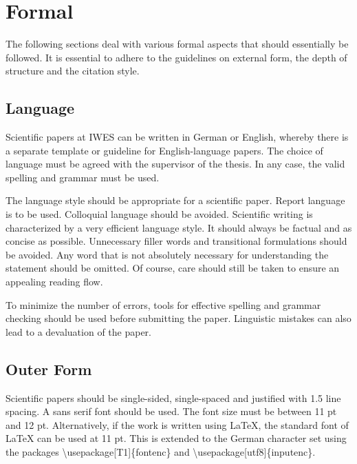 \chapter{Formal}
\label{cha:form_EN}

The following sections deal with various formal aspects that should essentially be followed. It is essential to adhere to the guidelines on external form, the depth of structure and the citation style.

\section{Language}
\label{sec:language}

Scientific papers at IWES can be written in German or English, whereby there is a separate template or guideline for English-language papers. The choice of language must be agreed with the supervisor of the thesis. In any case, the valid spelling and grammar must be used.

The language style should be appropriate for a scientific paper. Report language is to be used. Colloquial language should be avoided. Scientific writing is characterized by a very efficient language style. It should always be factual and as concise as possible. Unnecessary filler words and transitional formulations should be avoided. Any word that is not absolutely necessary for understanding the statement should be omitted. Of course, care should still be taken to ensure an appealing reading flow.

To minimize the number of errors, tools for effective spelling and grammar checking should be used before submitting the paper. Linguistic mistakes can also lead to a devaluation of the paper.




\section{Outer Form}
\label{sec:form_EN}

Scientific papers should be single-sided, single-spaced and justified with 1.5 line spacing. A sans serif font should be used. The font size must be between 11 pt and 12 pt. Alternatively, if the work is written using \LaTeX{}, the standard font of \LaTeX{} can be used at 11 pt. This is extended to the German character set using the packages \textbackslash{}usepackage[T1]\{fontenc\} and \textbackslash{}usepackage[utf8]\{inputenc\}.

